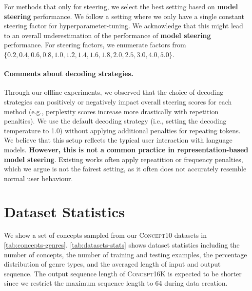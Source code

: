 \documentclass{article}
\theoremstyle{plain}
\theoremstyle{definition}
\theoremstyle{remark}
\newcommand{\methodtag}[2]{%
  \tikz[baseline=(char.base)]{%
    \node[
      fill=#1,
      rounded corners=2pt,
      text=white,
      font=\bfseries,
      minimum width=1em,
      minimum height=1em,
      align=center,
      inner sep=0pt
    ](char){#2};%
  }%
}
\newcommand{\steeringtag}{\protect\methodtag{steeringcolor}{S}}
\begin{document}
For methods that only for steering, we select the best setting based on \textbf{\steeringtag{} model steering} performance. We follow a setting where we only have a single constant steering factor for hyperparameter-tuning. We acknowledge that this might lead to an overall underestimation of the performance of \textbf{\steeringtag{} model steering} performance. For steering factors, we enumerate factors from $\{0.2, 0.4, 0.6, 0.8, 1.0, 1.2, 1.4, 1.6, 1.8, 2.0, 2.5, 3.0, 4.0,
5.0\}$.

\paragraph{Comments about decoding strategies.} Through our offline experiments, we observed that the choice of decoding strategies can positively or negatively impact overall steering scores for each method (e.g., perplexity scores increase more drastically with repetition penalties). We use the default decoding strategy (i.e., setting the decoding temperature to 1.0) without applying additional penalties for repeating tokens. We believe that this setup reflects the typical user interaction with language models. \textbf{However, this is not a common practice in representation-based model steering}. Existing works often apply repeatition or frequency penalties, which we argue is not the fairest setting, as it often does not accurately resemble normal user behaviour. 




\clearpage

\section{Dataset Statistics}\label{sec:data_stats}
We show a set of concepts sampled from our \textsc{Concept10} datasets in \cref{tab:concepts-genres}. \cref{tab:datasets-stats} shows dataset statistics including the number of concepts, the number of training and testing examples, the percentage distribution of genre types, and the averaged length of input and output sequence. The output sequence length of \textsc{Concept16K} is expected to be shorter since we restrict the maximum sequence length to 64 during data creation.
\end{document}
